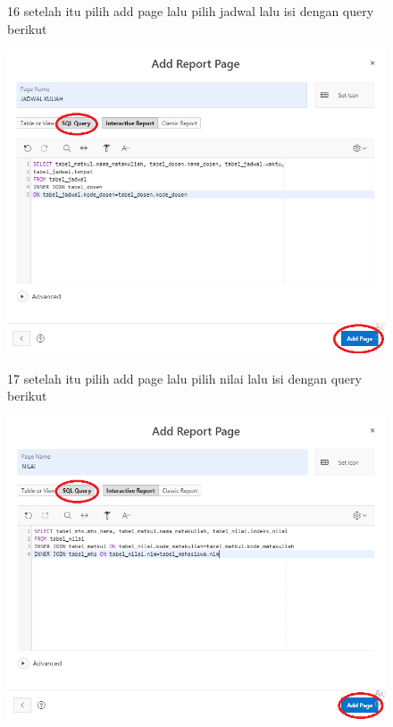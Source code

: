 \begin{enumerate}
\begin{figure}
\item[16]setelah itu pilih add page lalu pilih jadwal lalu isi dengan query berikut
 \begin{center}
\includegraphics[scale=0.4]{apex/ss25.png}
    \caption{\textit{}}
        \end{center}
\label{gambar}
\end{figure}

\begin{figure}
\item[17]setelah itu pilih add page lalu pilih nilai lalu isi dengan query berikut
 \begin{center}
\includegraphics[scale=0.4]{apex/ss26.png}
    \caption{\textit{}}
        \end{center}
\label{gambar}
\end{figure}


\end{enumerate}
